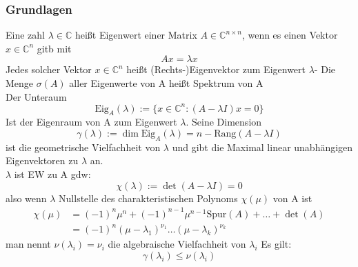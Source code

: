 \documentclass[
	ngerman,
	accentcolor=9c,%
	type=intern,
	marginpar=false
	]{tudapub}
\begin{document}
            \subsubsection{Grundlagen}
                \begin{definition}
                    Eine zahl $\lambda \in \mathbb{C}$ heißt Eigenwert einer Matrix $A \in \mathbb{C}^{n \times n}$,
                    wenn es einen Vektor $x \in \mathbb{C}^n$ gitb mit 
                    \begin{equation*}
                        Ax = \lambda x
                    \end{equation*}
                    Jedes solcher Vektor $x \in \mathbb{C}^n$ heißt (Rechts-)Eigenvektor zum Eigenwert $\lambda$-
                    Die Menge $\sigma(A)$  aller Eigenwerte von A heißt Spektrum von A\\
                    Der Unteraum
                    \begin{equation*}
                        \text{Eig}_A(\lambda):= \{x \in \mathbb{C}^n: (A-\lambda I)x = 0\}
                    \end{equation*}
                    Ist der Eigenraum von A zum Eigenwert $\lambda$. Seine Dimension
                    \begin{equation*}
                        \gamma(\lambda):= \dim \text{Eig}_A(\lambda) = n - \text{Rang}(A-\lambda I)
                    \end{equation*}
                    ist die geometrische Vielfachheit von $\lambda$ und gibt die Maximal linear unabhängigen Eigenvektoren zu $\lambda$ an.\\
                    $\lambda$ ist EW zu A gdw:
                    \begin{equation*}
                        \chi(\lambda):= \det(A-\lambda I) = 0
                    \end{equation*}
                    also wenn $\lambda$ Nullstelle des charakteristischen Polynoms $\chi(\mu)$ von A ist
                    \begin{align*}
                        \chi(\mu) &= (-1)^n \mu^n + (-1)^{n-1} \mu^{n-1}\text{Spur}(A)+\dots+\det(A)\\
                        &= (-1)^n (\mu - \lambda_1)^{\nu_1}\dots(\mu-\lambda_k)^{\nu_k}
                    \end{align*}
                    man nennt $\nu(\lambda_i) = \nu_i$ die algebraische Vielfachheit von $\lambda_i$
                    Es gilt:
                    \begin{equation*}
                        \gamma(\lambda_i)\leq\nu(\lambda_i)
                    \end{equation*}
                \end{definition}
\end{document}
